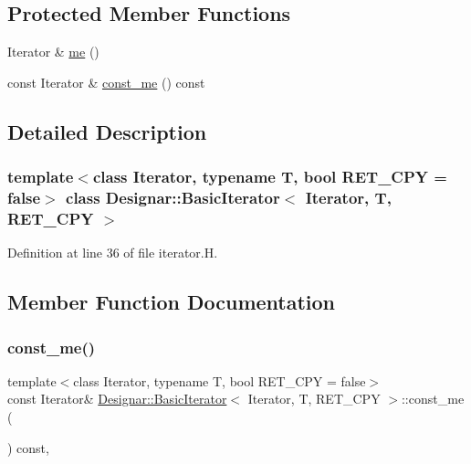 \subsection*{Protected Member Functions}
\begin{DoxyCompactItemize}
\item 
Iterator \& \hyperlink{class_designar_1_1_basic_iterator_a5b550cbd8bb7ee464e8cdb6b023c437a}{me} ()
\item 
const Iterator \& \hyperlink{class_designar_1_1_basic_iterator_a7ccea1264814695d7c9466daa713cb17}{const\+\_\+me} () const
\end{DoxyCompactItemize}


\subsection{Detailed Description}
\subsubsection*{template$<$class Iterator, typename T, bool R\+E\+T\+\_\+\+C\+PY = false$>$\newline
class Designar\+::\+Basic\+Iterator$<$ Iterator, T, R\+E\+T\+\_\+\+C\+P\+Y $>$}



Definition at line 36 of file iterator.\+H.



\subsection{Member Function Documentation}
\mbox{\label{class_designar_1_1_basic_iterator_a7ccea1264814695d7c9466daa713cb17}} 
\subsubsection{\texorpdfstring{const\+\_\+me()}{const\_me()}}
{\footnotesize\ttfamily template$<$class Iterator, typename T, bool R\+E\+T\+\_\+\+C\+PY = false$>$ \\
const Iterator\& \hyperlink{class_designar_1_1_basic_iterator}{Designar\+::\+Basic\+Iterator}$<$ Iterator, T, R\+E\+T\+\_\+\+C\+PY $>$\+::const\+\_\+me (\begin{DoxyParamCaption}{ }\end{DoxyParamCaption}) const\hspace{0.3cm}{\ttfamily [inline]}, {\ttfamily [protected]}}



